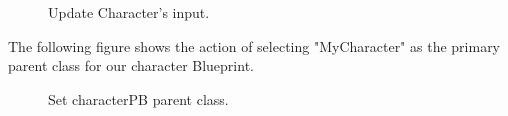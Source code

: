 \documentclass[12pt]{book}
\begin{document}
  \begin{figure}[!h]
    \centering
    \caption{Update Character's input.}
   \end{figure}

The following figure shows the action of selecting "MyCharacter" as the primary parent class for our character Blueprint. 

  \begin{figure}[!h]
    \centering
    \caption{Set characterPB parent class.}
  \end{figure}
  
\end{document}
